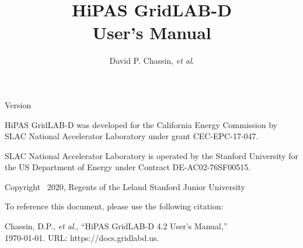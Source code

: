\documentclass{article}
\title 
{
	\LARGE HiPAS GridLAB-D
\\
	User's Manual
}
\author {
	David P. Chassin, \textit{et al}.
}
\begin{document}
\maketitle

\begin{center}

Version 

\vspace{0.5in}

HiPAS GridLAB-D was developed for the California Energy Commission by SLAC National Accelerator Laboratory under grant CEC-EPC-17-047.

\vspace{0.5in}

SLAC National Accelerator Laboratory is operated by the Stanford University for the US Department of Energy under Contract DE-AC02-76SF00515.

\vspace{0.5in}

Copyright \textcopyright~2020, Regents of the Leland Stanford Junior University

\vspace{0.5in}

To reference this document, please use the following citation:

Chassin, D.P., \textit{et al}., ``HiPAS GridLAB-D 4.2 User's Manual,''\\\today. URL: https://docs.gridlabd.us.

\end{center}


\end{document}

